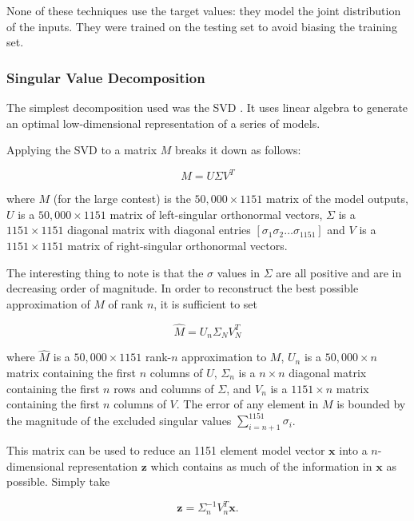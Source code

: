 \documentclass{article}
\begin{document}
None of these techniques use the target values: they model the joint distribution of the inputs.  
They were trained on the testing set to avoid biasing the training set.

\subsubsection{Singular Value Decomposition}

The simplest decomposition used was the SVD \cite{deerwester90}.  It uses linear algebra to generate an optimal low-dimensional representation of a series of models.

Applying the SVD to a matrix $M$ breaks it down as follows:

\begin{equation}
M = U \Sigma V^T
\end{equation}

where $M$ (for the large contest) is the $50,000 \times 1151$ matrix of the model outputs, $U$ is a $50,000 \times 1151$ matrix of left-singular orthonormal vectors, $\Sigma$ is a $1151 \times 1151$ diagonal matrix with diagonal entries $[ \sigma_1 \sigma_2 \ldots \sigma_{1151}]$ and $V$ is a $1151 \times 1151$ matrix of right-singular orthonormal vectors.

The interesting thing to note is that the $\sigma$ values in $\Sigma$ are all positive and are in decreasing order of magnitude.  In order to reconstruct the best possible approximation of $M$ of rank $n$, it is sufficient to set

\begin{equation}
\hat{M} = U_n \Sigma_N V_N^T
\end{equation}

where $\hat{M}$ is a $50,000 \times 1151$ rank-$n$ approximation to $M$, $U_n$ is a $50,000 \times n$ matrix containing the first $n$ columns of $U$, $\Sigma_n$ is a $n \times n$ diagonal matrix containing the first $n$ rows and columns of $\Sigma$, and $V_n$ is a $1151 \times n$ matrix containing the first $n$ columns of $V$.  The error of any element in $M$ is bounded by the magnitude of the excluded singular values $\sum_{i=n+1}^{1151} \sigma_i$.

This matrix can be used to reduce an 1151 element model vector $\mathbf{x}$ into a $n$-dimensional representation $\mathbf{z}$ which contains as much of the information in $\mathbf{x}$ as possible.  Simply take

\begin{equation}
\label{eqn:svd-encode}
\mathbf{z} = \Sigma_n^{-1} V_n^T \mathbf{x} .
\end{equation}
\end{document}
